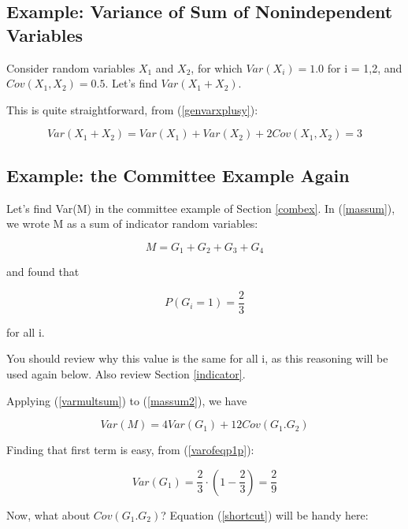 \subsection{Example:  Variance of Sum of Nonindependent Variables}
\label{simpleex}

Consider random variables $X_1$ and $X_2$, for which $Var(X_i) = 1.0$
for i = 1,2, and $Cov(X_1,X_2) = 0.5$.  Let's find $Var(X_1+X_2)$.

This is quite straightforward, from (\ref{genvarxplusy}):

\begin{equation}
Var(X_1+X_2) = Var(X_1) + Var(X_2) + 2 Cov(X_1,X_2) = 3
\end{equation}

\subsection{Example:  the Committee Example Again}

Let's find Var(M) in the committee example of Section \ref{combex}.  In
(\ref{massum}), we wrote M as a sum of indicator random variables:

\begin{equation}
\label{massum2}
M = G_1 + G_2 + G_3 + G_4 
\end{equation}

and found that

\begin{equation}
P(G_i = 1) = \frac{2}{3}
\end{equation}

for all i.  

You should review why this value is the same for all i, as
this reasoning will be used again below.  Also review Section
\ref{indicator}.

Applying (\ref{varmultsum}) to (\ref{massum2}), we have

\begin{equation}
\label{varm}
Var(M) = 4 Var(G_1) + 12 Cov(G_1.G_2)
\end{equation}

Finding that first term is easy, from (\ref{varofeqp1p}):

\begin{equation}
Var(G_1) = \frac{2}{3} \cdot \left ( 1 - \frac{2}{3} \right ) =
\frac{2}{9}
\end{equation}

Now, what about $Cov(G_1.G_2)$?  Equation (\ref{shortcut}) will be handy here:

